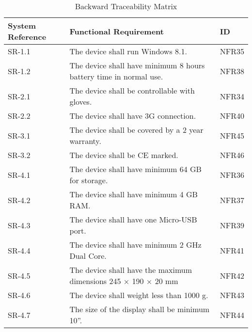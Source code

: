 \documentclass[Main]{subfiles}
\begin{document}
\begin{table}[htbp]
	\centering
	\begin{tabular}{p{1.8cm} p{11cm} l} \hline
	System Reference & Functional Requirement & ID\\\hline
	SR-1.1 & The device shall run Windows 8.1. & NFR35  \\
	SR-1.2 & The device shall have minimum 8 hours battery time in normal use. & NFR38 \\

	SR-2.1 & The device shall be controllable with gloves. & NFR34 \\
	SR-2.2 & The device shall have 3G connection. & NFR40 \\
	
	SR-3.1 & The device shall be covered by a 2 year warranty. & NFR45 \\
	SR-3.2 & The device shall be CE marked. & NFR46 \\

	SR-4.1 & The device shall have minimum 64 GB for storage. & NFR36 \\
	SR-4.2 & The device shall have minimum 4 GB RAM. & NFR37 \\
	SR-4.3 & The device shall have one Micro-USB port. & NFR39 \\
	SR-4.4 & The device shall have minimum 2 GHz Dual Core. & NFR41 \\
	SR-4.5 & The device shall have the maximum dimensions 245 × 190 × 20 mm & NFR42 \\
	SR-4.6 & The device shall weight less than 1000 g. & NFR43 \\
	SR-4.7 & The size of the display shall be minimum 10”. & NFR44 \\\hline 
	\end{tabular}
\caption{Backward Traceability Matrix}
\label{Tab:BackwardTraceability}
\end{table}
\end{document}
